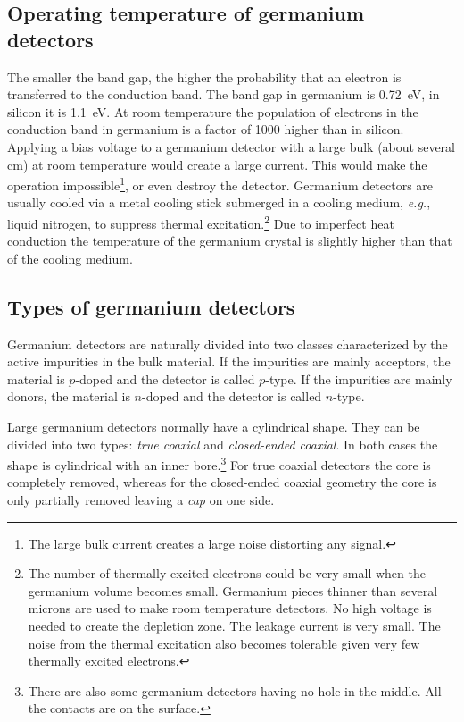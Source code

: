 \subsection{Operating temperature of germanium detectors}
\label{sec:det:temp}
The smaller the band gap, the higher the probability that an electron
is transferred to the conduction band. The band gap in germanium is
0.72~eV, in silicon it is 1.1~eV. At room temperature the population
of electrons in the conduction band in germanium is a factor of 1000
higher than in silicon. Applying a bias voltage to a germanium
detector with a large bulk (about several cm) at room temperature
would create a large current. This would make the operation
impossible\footnote{The large bulk current creates a large noise
distorting any signal.}, or even destroy the detector. Germanium
detectors are usually cooled via a metal cooling stick submerged in a
cooling medium, \textit{e.g.}, liquid nitrogen, to suppress thermal
excitation.\footnote{The number of thermally excited electrons could
be very small when the germanium volume becomes small. Germanium
pieces thinner than several microns are used to make room temperature
detectors. No high voltage is needed to create the depletion zone. The
leakage current is very small. The noise from the thermal excitation
also becomes tolerable given very few thermally excited electrons.}
Due to imperfect heat conduction the temperature of the germanium
crystal is slightly higher than that of the cooling medium.

\subsection{Types of germanium detectors}
\label{sec:det:type}
Germanium detectors are naturally divided into two classes
characterized by the active impurities in the bulk material. If the
impurities are mainly acceptors, the material is $p$-doped and the
detector is called $p$-type. If the impurities are mainly donors, the
material is $n$-doped and the detector is called $n$-type.

Large germanium detectors normally have a cylindrical shape. They can
be divided into two types: \textit{true coaxial} and
\textit{closed-ended coaxial}. In both cases the shape is cylindrical
with an inner bore.\footnote{There are also some germanium detectors
having no hole in the middle. All the contacts are on the surface.}
For true coaxial detectors the core is completely removed, whereas for
the closed-ended coaxial geometry the core is only partially removed
leaving a \textit{cap} on one side.

